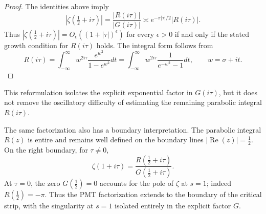 \documentclass[12pt,english]{article}
\theoremstyle{plain} %
\theoremstyle{remark} %
\begin{document}
\begin{proof}
The identities above imply
$$
|\zeta(\tfrac{1}{2}+i\tau)|
=
\frac{|R(i\tau)|}{|G(i\tau)|}
\asymp
e^{-\pi|\tau|/2}|R(i\tau)|.
$$
Thus $|\zeta(\tfrac{1}{2}+i\tau)|=O_\epsilon((1+|\tau|)^\epsilon)$
for every $\epsilon>0$ if and only if the stated growth condition for
$R(i\tau)$ holds. The integral form follows from
$$
R(i\tau)
=
\int_{-\infty}^{\infty}
w^{2i\tau}\frac{e^{w^2}}{1-e^{w^2}}dt
=
\int_{-\infty}^{\infty}
w^{2i\tau}\frac{1}{e^{-w^2}-1}dt,
\qquad w=\sigma+it.
$$
\end{proof}
This reformulation isolates the explicit exponential factor in $G(i\tau)$, but
it does not remove the oscillatory difficulty of estimating the remaining
parabolic integral $R(i\tau)$.

The same factorization also has a boundary interpretation. The parabolic
integral $R(z)$ is entire and remains well defined on the boundary lines
$|\operatorname{Re}(z)|=\tfrac{1}{2}$. On the right boundary, for
$\tau\neq0$,
$$
\zeta(1+i\tau)=\frac{R(\tfrac{1}{2}+i\tau)}
{G(\tfrac{1}{2}+i\tau)}.
$$
At $\tau=0$, the zero $G(\tfrac{1}{2})=0$ accounts for the pole of $\zeta$ at
$s=1$; indeed $R(\tfrac{1}{2})=-\pi$. Thus the PMT factorization extends to
the boundary of the critical strip, with the singularity at $s=1$ isolated
entirely in the explicit factor $G$.
\medskip
\end{document}
